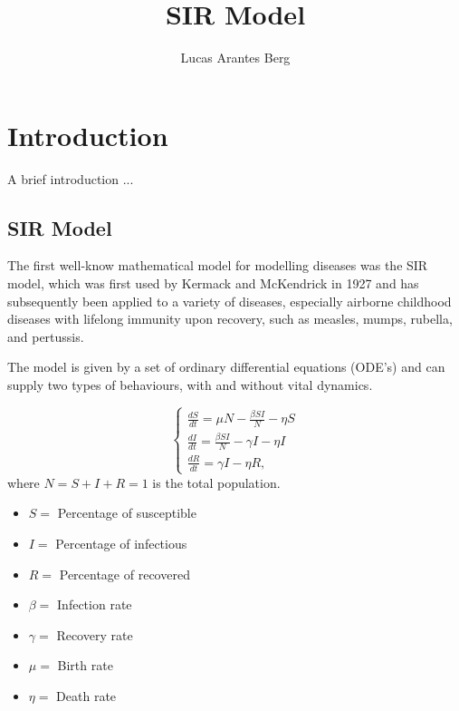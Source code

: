 \documentclass[12pt]{article}
\title{SIR Model}
\author{Lucas Arantes Berg\inst{1}}
\begin{document}
 

\maketitle

\begin{abstract}
   
\end{abstract}
     
\begin{resumo} 
  
\end{resumo}


\section{Introduction}

A brief introduction ...

\subsection{SIR Model}

The first well-know mathematical model for modelling diseases was the SIR model, which was first used by Kermack and McKendrick in 1927 and has subsequently been applied to a variety of diseases, especially airborne childhood diseases with lifelong immunity upon recovery, such as measles, mumps, rubella, and pertussis. 

The model is given by a set of ordinary differential equations (ODE's) and can supply two types of behaviours, with and without vital dynamics.

\begin{equation}
	\begin{cases}
		\frac{dS}{dt} = \mu N - \frac{\beta S I}{N} - \eta S \\
		\frac{dI}{dt} = \frac{\beta S I}{N} - \gamma I - \eta I \\
		\frac{dR}{dt} = \gamma I - \eta R,
	\end{cases}
\end{equation}
where $N = S + I + R = 1$ is the total population.

\begin{itemize}
	\item $S = $ Percentage of susceptible
	\item $I = $ Percentage of infectious
	\item $R = $ Percentage of recovered
	\item $\beta = $ Infection rate
	\item $\gamma = $ Recovery rate
	\item $\mu = $ Birth rate
	\item $\eta = $ Death rate
\end{itemize}




\end{document}
